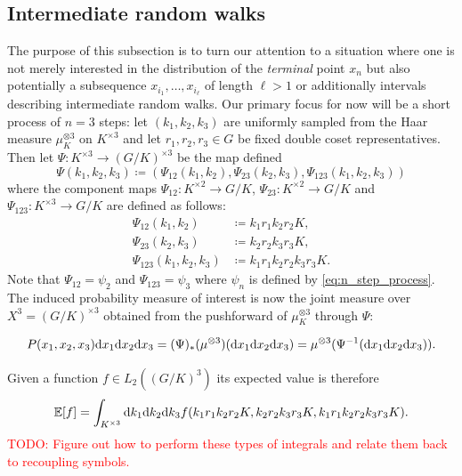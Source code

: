 \documentclass[notitlepage]{article}
\begin{document}
\subsection{Intermediate random walks}

The purpose of this subsection is to turn our attention to a situation where one is not merely interested in the distribution of the \textit{terminal} point $x_n$ but also potentially a subsequence $x_{i_1}, \ldots, x_{i_\ell}$ of length $\ell > 1$ or additionally intervals describing intermediate random walks.
Our primary focus for now will be a short process of $n=3$ steps: let $(k_1, k_2, k_3)$ are uniformly sampled from the Haar measure $\mu_K^{\otimes 3}$ on $K^{\times 3}$ and let $r_1, r_2, r_3 \in G$ be fixed double coset representatives. 
Then let $\Psi : K^{\times 3} \to (G/K)^{\times 3}$ be the map defined
\begin{equation}
    \Psi(k_1, k_2, k_3) \coloneqq (\Psi_{12}(k_1, k_2), \Psi_{23}(k_2, k_3), \Psi_{123}(k_1, k_2, k_3))
\end{equation}
where the component maps $\Psi_{12} : K^{\times 2} \to G/K$, $\Psi_{23} : K^{\times 2} \to G/K$ and $\Psi_{123} : K^{\times 3} \to G/K$ are defined as follows:
\begin{align}
    \Psi_{12}(k_1, k_2) &\coloneqq k_1 r_1 k_2 r_2 K, \\
    \Psi_{23}(k_2, k_3) &\coloneqq k_2 r_2 k_3 r_3 K, \\
    \Psi_{123}(k_1, k_2, k_3) &\coloneqq k_1 r_1 k_2 r_2 k_3 r_3 K.
\end{align}
Note that $\Psi_{12} = \psi_2$ and $\Psi_{123} = \psi_3$ where $\psi_n$ is defined by \cref{eq:n_step_process}.
The induced probability measure of interest is now the joint measure over $X^{3} = (G/K)^{\times 3}$ obtained from the pushforward of $\mu_K^{\otimes 3}$ through $\Psi$:

\begin{equation}
    P(x_1, x_2, x_3) \mathrm{d} x_1 \mathrm{d} x_2 \mathrm{d} x_3 = (\Psi)_{*}(\mu^{\otimes 3})(\mathrm{d} x_1 \mathrm{d} x_2 \mathrm{d} x_3) = \mu^{\otimes 3}(\Psi^{-1}(\mathrm{d} x_1\mathrm{d} x_2 \mathrm{d} x_3)).
\end{equation}

Given a function $f \in L_2((G/K)^{3})$ its expected value is therefore
\begin{equation}
    \mathbb E[f] = \int_{K^{\times 3}} \mathrm{d} k_1 \mathrm{d} k_2 \mathrm{d} k_3 f(k_1r_1k_2r_2K, k_2r_2k_3r_3K, k_1r_1k_2r_2k_3r_3K).
\end{equation}
\textcolor{red}{TODO: Figure out how to perform these types of integrals and relate them back to recoupling symbols.}
\end{document}
